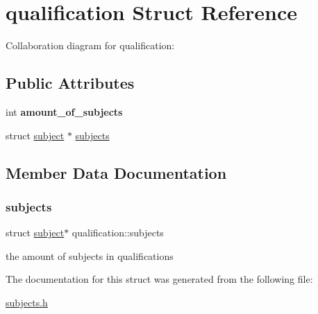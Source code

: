 \hypertarget{structqualification}{}\section{qualification Struct Reference}
\label{structqualification}


Collaboration diagram for qualification\+:
\subsection*{Public Attributes}
\begin{DoxyCompactItemize}
\item 
\mbox{\label{structqualification_a4eb2ae542b852c954bd4a6e6eca1fb87}} 
int {\bfseries amount\+\_\+of\+\_\+subjects}
\item 
struct \hyperlink{structsubject}{subject} $\ast$ \hyperlink{structqualification_aaa12bc20ddf86ab9297ab4dd06cd774f}{subjects}
\end{DoxyCompactItemize}


\subsection{Member Data Documentation}
\mbox{\label{structqualification_aaa12bc20ddf86ab9297ab4dd06cd774f}} 
\subsubsection{\texorpdfstring{subjects}{subjects}}
{\footnotesize\ttfamily struct \hyperlink{structsubject}{subject}$\ast$ qualification\+::subjects}

the amount of subjects in qualifications 

The documentation for this struct was generated from the following file\+:\begin{DoxyCompactItemize}
\item 
\hyperlink{subjects_8h}{subjects.\+h}\end{DoxyCompactItemize}
